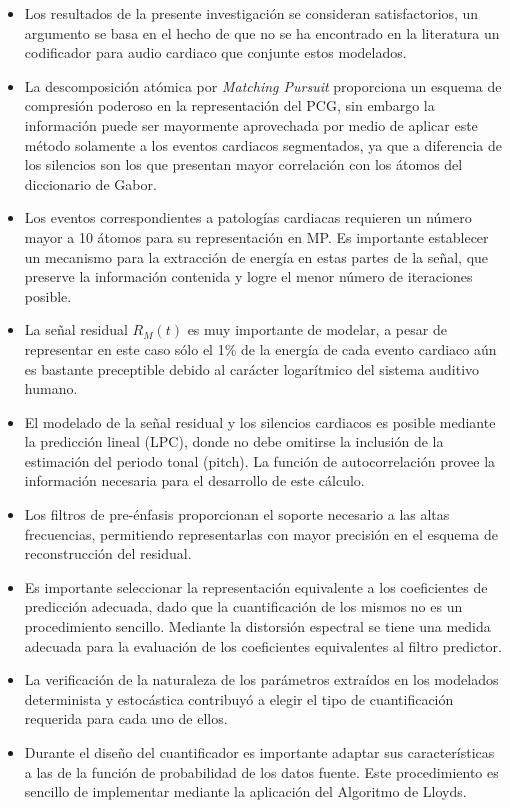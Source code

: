 \begin{itemize}
	\item Los resultados de la presente investigación se consideran satisfactorios, un argumento se basa en el hecho de que no  se ha encontrado en la literatura un codificador para audio cardiaco que conjunte estos modelados. 
	\item La descomposición atómica por \emph{Matching Pursuit} proporciona un esquema de compresión poderoso en la representación del PCG, sin embargo la información puede ser mayormente aprovechada por medio de aplicar este método solamente a los eventos cardiacos segmentados, ya que a diferencia de los silencios son los que presentan mayor correlación con los átomos del  diccionario de Gabor.
	\item Los eventos correspondientes a patologías cardiacas requieren un número mayor a 10 átomos para su representación en MP. Es importante establecer un mecanismo para la extracción de energía en estas partes de la señal, que preserve la información contenida y logre el menor número de iteraciones posible. 
	\item La señal residual $R_{M}(t)$ es muy importante de modelar, a pesar de representar en este caso sólo el 1\% de la energía de 			cada evento cardiaco aún es bastante preceptible debido al carácter logarítmico del sistema auditivo humano. 
		\item El modelado de la señal residual y los silencios cardiacos es posible mediante la predicción lineal (LPC), donde no debe omitirse la 			inclusión de la estimación del periodo tonal (pitch). La función de autocorrelación provee la información necesaria para el desarrollo 		de este cálculo.
	\item Los filtros de pre-énfasis proporcionan el soporte necesario a las altas frecuencias, permitiendo representarlas con mayor precisión 		en el esquema de reconstrucción del residual.
	\item Es importante seleccionar la representación equivalente a los coeficientes de predicción adecuada, dado que la cuantificación de los 		mismos no es un procedimiento sencillo. Mediante la distorsión espectral se tiene una medida adecuada para la evaluación de los 			coeficientes equivalentes al filtro predictor.
		\item La verificación de la naturaleza de los parámetros extraídos en los modelados determinista y estocástica contribuyó a elegir el tipo de cuantificación requerida para cada uno de ellos. 		
	\item Durante el diseño del cuantificador es importante adaptar sus características a las de la función de probabilidad de los datos fuente. 		Este procedimiento es sencillo de implementar mediante la aplicación del Algoritmo de Lloyds.

\end{itemize}
